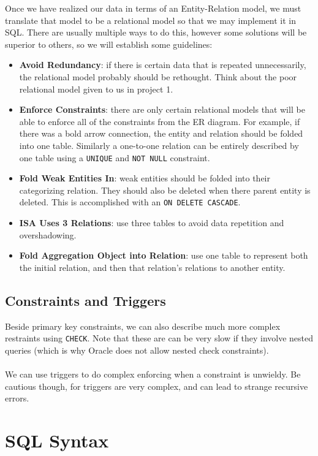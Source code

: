 \documentclass{article}
\begin{document}
Once we have realized our data in terms of an Entity-Relation model, we must translate that model to be a relational model so that we may implement it in SQL. There are usually multiple ways to do this, however some solutions will be superior to others, so we will establish some guidelines:
\begin{itemize}
\item \textbf{Avoid Redundancy}: if there is certain data that is repeated unnecessarily, the relational model probably should be rethought. Think about the poor relational model given to us in project 1.
\item \textbf{Enforce Constraints}: there are only certain relational models that will be able to enforce all of the constraints from the ER diagram. For example, if there was a bold arrow connection, the entity and relation should be folded into one table. Similarly a one-to-one relation can be entirely described by one table using a \texttt{UNIQUE} and \texttt{NOT NULL} constraint.
\item \textbf{Fold Weak Entities In}: weak entities should be folded into their categorizing relation. They should also be deleted when there parent entity is deleted. This is accomplished with an \texttt{ON DELETE CASCADE}.
\item \textbf{ISA Uses 3 Relations}: use three tables to avoid data repetition and overshadowing.
\item \textbf{Fold Aggregation Object into Relation}: use one table to represent both the initial relation, and then that relation's relations to another entity.
\end{itemize}

\subsection{Constraints and Triggers}

Beside primary key constraints, we can also describe much more complex restraints using \texttt{CHECK}. Note that these are can be very slow if they involve nested queries (which is why Oracle does not allow nested check constraints).
\\\\
We can use triggers to do complex enforcing when a constraint is unwieldy. Be cautious though, for triggers are very complex, and can lead to strange recursive errors.
\pagebreak
\section{SQL Syntax}
\end{document}
